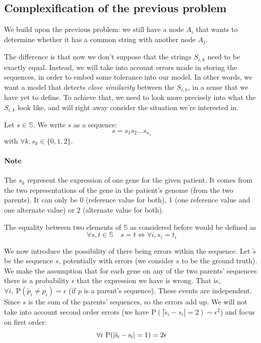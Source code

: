 \documentclass[usletter,11pt,final]{article}
\begin{document}
\subsection{Complexification of the previous problem}

We build upon the previous problem: we still have a node $A_i$ that wants to determine whether it has a common string with another node $A_j$.

The difference is that now we don't suppose that the strings $S_{i,k}$ need to be exactly equal. Instead, we will take into account errors made in storing the sequences, in order to embed some tolerance into our model. In other words, we want a model that detects \textit{close similarity} between the $S_{i,k}$, in a sense that we have yet to define. To achieve that, we need to look more precisely into what the $S_{i,k}$ look like, and will right away consider the situation we're interested in.

Let $s \in \mathbb{S}$. We write $s$ as a sequence: $$s = s_1s_2...s_{n_s}$$ with $\forall k, s_k \in \{0,1,2\}$.

\paragraph{Note} The $s_k$ represent the expression of one gene for the given patient. It comes from the two representations of the gene in the patient's genome (from the two parents). It can only be 0 (reference value for both), 1 (one reference value and one alternate value) or 2 (alternate value for both).

\vspace{5mm}
The equality between two elements of $\mathbb{S}$ as considered before would be defined as $$ \forall s,t \in \mathbb{S} \quad s = t \Leftrightarrow \forall i, s_i=t_i$$

We now introduce the possibility of there being errors within the sequence. Let $\tilde{s}$ be the sequence $s$, potentially with errors (we consider $s$ to be the ground truth). We make the assumption that for each gene on any of the two parents' sequences there is a probability $\epsilon$ that the expression we have is wrong. That is, $\forall i,~ \textrm{P}(\tilde{p}_i \neq p_i) = \epsilon$ (if $p$ is a parent's sequence). These events are independent. Since $s$ is the sum of the parents' sequences, so the errors add up. We will not take into account second order errors (we have $\textrm{P}(|\tilde{s}_i - s_i| = 2) \sim \epsilon^2$) and focus on first order: $$\forall i ~ \rm P (|\tilde{s}_i - s_i| = 1) = 2\epsilon$$
\end{document}
